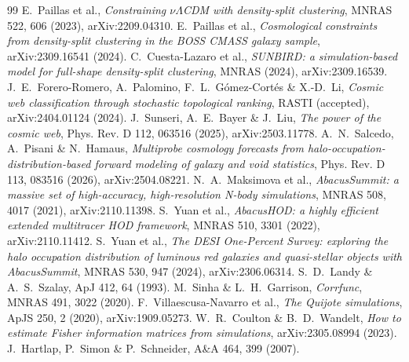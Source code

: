 \begin{thebibliography}{99}
 E.~Paillas et al., \emph{Constraining $\nu\Lambda$CDM with density-split clustering}, MNRAS 522, 606 (2023), arXiv:2209.04310.
 E.~Paillas et al., \emph{Cosmological constraints from density-split clustering in the BOSS CMASS galaxy sample}, arXiv:2309.16541 (2024).
 C.~Cuesta-Lazaro et al., \emph{SUNBIRD: a simulation-based model for full-shape density-split clustering}, MNRAS (2024), arXiv:2309.16539.
 J.~E.~Forero-Romero, A.~Palomino, F.~L.~G\'omez-Cort\'es \& X.-D.~Li, \emph{Cosmic web classification through stochastic topological ranking}, RASTI (accepted), arXiv:2404.01124 (2024).
 J.~Sunseri, A.~E.~Bayer \& J.~Liu, \emph{The power of the cosmic web}, Phys. Rev. D 112, 063516 (2025), arXiv:2503.11778.
 A.~N.~Salcedo, A.~Pisani \& N.~Hamaus, \emph{Multiprobe cosmology forecasts from halo-occupation-distribution-based forward modeling of galaxy and void statistics}, Phys. Rev. D 113, 083516 (2026), arXiv:2504.08221.
 N.~A.~Maksimova et al., \emph{AbacusSummit: a massive set of high-accuracy, high-resolution N-body simulations}, MNRAS 508, 4017 (2021), arXiv:2110.11398.
 S.~Yuan et al., \emph{AbacusHOD: a highly efficient extended multitracer HOD framework}, MNRAS 510, 3301 (2022), arXiv:2110.11412.
 S.~Yuan et al., \emph{The DESI One-Percent Survey: exploring the halo occupation distribution of luminous red galaxies and quasi-stellar objects with AbacusSummit}, MNRAS 530, 947 (2024), arXiv:2306.06314.
 S.~D.~Landy \& A.~S.~Szalay, ApJ 412, 64 (1993).
 M.~Sinha \& L.~H.~Garrison, \emph{Corrfunc}, MNRAS 491, 3022 (2020).
 F.~Villaescusa-Navarro et al., \emph{The Quijote simulations}, ApJS 250, 2 (2020), arXiv:1909.05273.
 W.~R.~Coulton \& B.~D.~Wandelt, \emph{How to estimate Fisher information matrices from simulations}, arXiv:2305.08994 (2023).
 J.~Hartlap, P.~Simon \& P.~Schneider, A\&A 464, 399 (2007).
\end{thebibliography}
